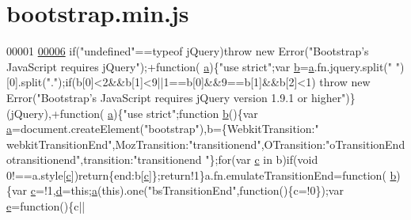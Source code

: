 \hypertarget{bootstrap_8min_8js_source}{}\section{bootstrap.\+min.\+js}
\label{bootstrap_8min_8js_source}

\begin{DoxyCode}
00001 
\hypertarget{bootstrap_8min_8js_source_l00006}{}\hyperlink{bootstrap_8min_8js_a3635f2df5844f69204b70bf7b3983587}{00006} \textcolor{keywordflow}{if}(\textcolor{stringliteral}{"undefined"}==typeof jQuery)\textcolor{keywordflow}{throw} \textcolor{keyword}{new} Error(\textcolor{stringliteral}{"Bootstrap's JavaScript requires jQuery"});+\textcolor{keyword}{function}(
      \hyperlink{bootstrap_8min_8js_ae8f6b400ed3390908c5cdeebed3a82b9}{a})\{\textcolor{stringliteral}{"use strict"};var \hyperlink{bootstrap_8min_8js_ac0431efac4d7c393d1e70b86115cb93f}{b}=\hyperlink{bootstrap_8min_8js_ae8f6b400ed3390908c5cdeebed3a82b9}{a}.fn.jquery.split(\textcolor{stringliteral}{" "})[0].split(\textcolor{stringliteral}{"."});\textcolor{keywordflow}{if}(b[0]<2&&b[1]<9||1==b[0]&&9==b[1]&&b[2]<1)\textcolor{keywordflow}{
      throw} \textcolor{keyword}{new} Error(\textcolor{stringliteral}{"Bootstrap's JavaScript requires jQuery version 1.9.1 or higher"})\}(jQuery),+\textcolor{keyword}{function}(
      \hyperlink{bootstrap_8min_8js_ae8f6b400ed3390908c5cdeebed3a82b9}{a})\{\textcolor{stringliteral}{"use strict"};\textcolor{keyword}{function} \hyperlink{bootstrap_8min_8js_ac0431efac4d7c393d1e70b86115cb93f}{b}()\{var \hyperlink{bootstrap_8min_8js_ae8f6b400ed3390908c5cdeebed3a82b9}{a}=document.createElement(\textcolor{stringliteral}{"bootstrap"}),b=\{WebkitTransition:\textcolor{stringliteral}{"
      webkitTransitionEnd"},MozTransition:\textcolor{stringliteral}{"transitionend"},OTransition:\textcolor{stringliteral}{"oTransitionEnd otransitionend"},transition:\textcolor{stringliteral}{"transitionend
      "}\};\textcolor{keywordflow}{for}(var \hyperlink{bootstrap_8min_8js_ad9d1ac02e33c4aed62ad517a7cb8b3fb}{c} in b)\textcolor{keywordflow}{if}(\textcolor{keywordtype}{void} 0!==a.style[\hyperlink{bootstrap_8min_8js_ad9d1ac02e33c4aed62ad517a7cb8b3fb}{c}])\textcolor{keywordflow}{return}\{end:b[\hyperlink{bootstrap_8min_8js_ad9d1ac02e33c4aed62ad517a7cb8b3fb}{c}]\};\textcolor{keywordflow}{return}!1\}a.fn.emulateTransitionEnd=\textcolor{keyword}{function}(
      \hyperlink{bootstrap_8min_8js_ac0431efac4d7c393d1e70b86115cb93f}{b})\{var \hyperlink{bootstrap_8min_8js_ad9d1ac02e33c4aed62ad517a7cb8b3fb}{c}=!1,\hyperlink{bootstrap_8min_8js_aeb337d295abaddb5ec3cb34cc2e2bbc9}{d}=\textcolor{keyword}{this};\hyperlink{bootstrap_8min_8js_ae8f6b400ed3390908c5cdeebed3a82b9}{a}(\textcolor{keyword}{this}).one(\textcolor{stringliteral}{"bsTransitionEnd"},\textcolor{keyword}{function}()\{c=!0\});var \hyperlink{bootstrap_8min_8js_ab5902775854a8b8440bcd25e0fe1c120}{e}=\textcolor{keyword}{function}()\{c||

\end{DoxyCode}
